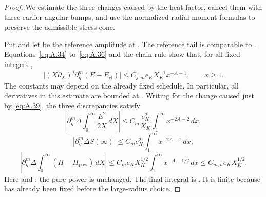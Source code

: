 \begin{proof}
We estimate the three changes caused by the heat factor, cancel them with three earlier angular bumps, and use the
normalized radial moment formulas to preserve the admissible stress cone.

Put  and let  be the reference amplitude at
. The reference tail is comparable to
. Equations~\eqref{eq:A.34} to~\eqref{eq:A.36} and the chain rule show that,
for all fixed integers ,
\[
  \bigl|(X\partial_X)^j\partial_\eta^m(E-E_{\mathrm{cl}})\bigr|
  \leq C_{j,m}e_KX_K^{-1}x^{-A-1},\qquad x\geq 1.
\]
The constants may depend on the already fixed schedule. In particular, all derivatives in this estimate are bounded at
. Writing  for the change caused just by \eqref{eq:A.39}, the three
discrepancies satisfy
\begin{equation}
  \left|\partial_\eta^m\Delta\int_0^\infty\frac{E^2}{2X}\,dX\right|
  \leq C_m\frac{e_K^2}{X_K}\int_1^\infty x^{-2A-2}\,dx,
  \tag{A.40}\label{eq:A.40}
\end{equation}
\begin{equation}
  \left|\partial_\eta^m\Delta S(\infty)\right|
  \leq C_me_K^2\int_1^\infty x^{-2A-1}\,dx,
  \tag{A.41}\label{eq:A.41}
\end{equation}
\begin{equation}
  \left|\partial_\eta^m\Delta\int_0^\infty(H-H_{\mathrm{pow}})\,dX\right|
  \leq C_me_KX_K^{1/2}\int_1^\infty x^{-A-1/2}\,dx
  \leq C_{m,h}e_KX_K^{1/2}.
  \tag{A.42}\label{eq:A.42}
\end{equation}
Here  and
; the pure power is unchanged. The final integral is
. It is finite because  has already been fixed before the large-radius choice.


\end{proof}
